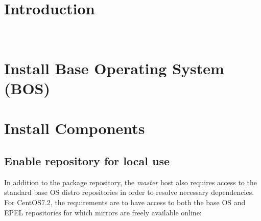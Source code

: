 \documentclass[letterpaper]{article}
\newcommand{\baseOS}{CentOS7.2}
\begin{document}
 

\newpage
\tableofcontents
\newpage


\section{Introduction} \label{sec:introduction}

 \\








\section{Install Base Operating System (BOS)}



\section{Install \OHPC{} Components} \label{sec:basic_install}


\subsection{Enable \OHPC{} repository for local use} \label{sec:enable_repo}



In addition to the \OHPC{} package repository, the {\em master} host also
requires access to the standard base OS distro repositories in order to resolve
necessary dependencies. For \baseOS{}, the requirements are to have access to
both the base OS and EPEL repositories for which mirrors are freely available online:
\end{document}
